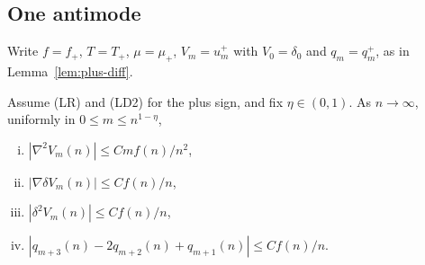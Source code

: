 \subsection{One antimode}\label{app:antimode}

Write $f=f_\plus$, $T=T_\plus$, $\mu=\mu_\plus$, $V_m=u^\plus_m$ with $V_0=\delta_0$ and
$q_m=q^\plus_m$, as in Lemma~\ref{lem:plus-diff}.

\begin{lemma}\label{lem:plus-second}
Assume (LR) and (LD2) for the plus sign, and fix $\eta\in(0,1)$. As $n\to\infty$, uniformly in
$0\le m\le n^{1-\eta}$,
\begin{enumerate}[(i)]
\item $|\nabla^2V_m(n)|\le Cmf(n)/n^2$,
\item $|\nabla\delta V_m(n)|\le Cf(n)/n$,
\item $|\delta^2V_m(n)|\le Cf(n)/n$,
\item $|q_{m+3}(n)-2q_{m+2}(n)+q_{m+1}(n)|\le Cf(n)/n$.
\end{enumerate}
\end{lemma}

